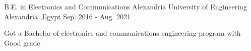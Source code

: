 

\begin{cventries}
  \cventry
    {\normalsize B.E. in Electronics and Communications} %
    {\large Alexandria University of Engineering} %
    {\normalsize Alexandria ,\normalsize Egypt} %
    {\normalsize Sep. 2016 - \normalsize Aug. 2021} %
    {
      \begin{cvitems} %
        \item {\normalsize Got a Bachelor of electronics and communications engineering program with Good grade}
      \end{cvitems}
    }

\end{cventries}
